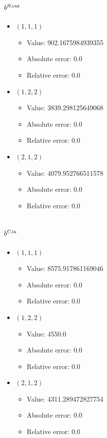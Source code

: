 \documentclass{article}%
\begin{document}
\subsection{$b^{\textsl{H},\text{out}}$}%
\begin{itemize}%
	\item $(1, 1, 1)$%
	\begin{itemize}%
		\item Value: 902.1675984939355%
		\item Absolute error: 0.0%
		\item Relative error: 0.0%
	\end{itemize}%
	\item $(1, 2, 2)$%
	\begin{itemize}%
		\item Value: 3839.298125649068%
		\item Absolute error: 0.0%
		\item Relative error: 0.0%
	\end{itemize}%
	\item $(2, 1, 2)$%
	\begin{itemize}%
		\item Value: 4079.952766511578%
		\item Absolute error: 0.0%
		\item Relative error: 0.0%
	\end{itemize}%
\end{itemize}%
\subsection{$b^{\textsl{C},\text{in}}$}%
\begin{itemize}%
	\item $(1, 1, 1)$%
	\begin{itemize}%
		\item Value: 8575.917861169046%
		\item Absolute error: 0.0%
		\item Relative error: 0.0%
	\end{itemize}%
	\item $(1, 2, 2)$%
	\begin{itemize}%
		\item Value: 4550.0%
		\item Absolute error: 0.0%
		\item Relative error: 0.0%
	\end{itemize}%
	\item $(2, 1, 2)$%
	\begin{itemize}%
		\item Value: 4311.289472827754%
		\item Absolute error: 0.0%
		\item Relative error: 0.0%
	\end{itemize}%
\end{itemize}%
\end{document}
